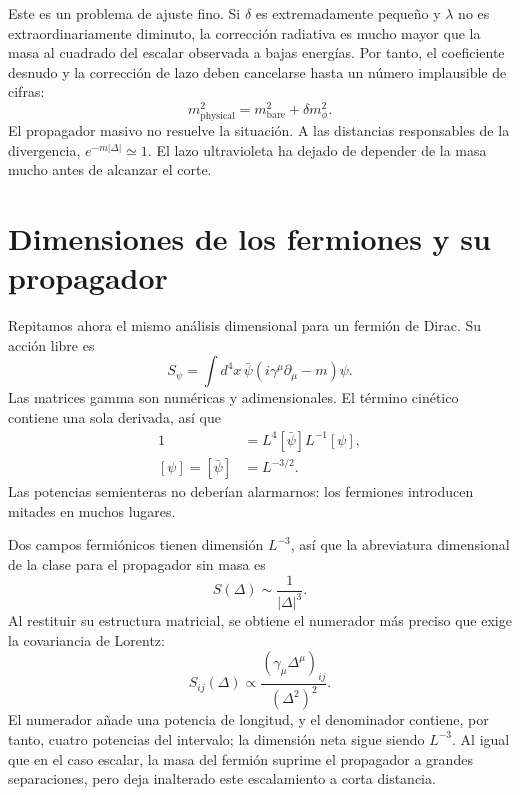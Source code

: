 Este es un problema de ajuste fino. Si \(\delta\) es extremadamente pequeño y \(\lambda\) no es extraordinariamente diminuto, la corrección radiativa es mucho mayor que la masa al cuadrado del escalar observada a bajas energías. Por tanto, el coeficiente desnudo y la corrección de lazo deben cancelarse hasta un número implausible de cifras:
\begin{equation}
m_{\mathrm{physical}}^2
=m_{\mathrm{bare}}^2+\delta m_\phi^2.
\end{equation}
El propagador masivo no resuelve la situación. A las distancias responsables de la divergencia, \(e^{-m|\Delta|}\simeq1\). El lazo ultravioleta ha dejado de depender de la masa mucho antes de alcanzar el corte.

\section{Dimensiones de los fermiones y su propagador}

Repitamos ahora el mismo análisis dimensional para un fermión de Dirac. Su acción libre es
\begin{equation}
S_\psi=\int d^4x\,
\bar\psi\left(i\gamma^\mu\partial_\mu-m\right)\psi.
\end{equation}
Las matrices gamma son numéricas y adimensionales. El término cinético contiene una sola derivada, así que
\begin{align}
1
&=L^4[\bar\psi]L^{-1}[\psi],\\
[\psi]=[\bar\psi]&=L^{-3/2}.
\end{align}
Las potencias semienteras no deberían alarmarnos: los fermiones introducen mitades en muchos lugares.

\begin{classroomqa}
\end{classroomqa}

Dos campos fermiónicos tienen dimensión \(L^{-3}\), así que la abreviatura dimensional de la clase para el propagador sin masa es
\begin{equation}
S(\Delta)\sim\frac{1}{|\Delta|^3}.
\end{equation}
Al restituir su estructura matricial, se obtiene el numerador más preciso que exige la covariancia de Lorentz:
\begin{equation}
S_{ij}(\Delta)
\propto
\frac{\left(\gamma_\mu\Delta^\mu\right)_{ij}}
{\left(\Delta^2\right)^2}.
\end{equation}
El numerador añade una potencia de longitud, y el denominador contiene, por tanto, cuatro potencias del intervalo; la dimensión neta sigue siendo \(L^{-3}\). Al igual que en el caso escalar, la masa del fermión suprime el propagador a grandes separaciones, pero deja inalterado este escalamiento a corta distancia.

